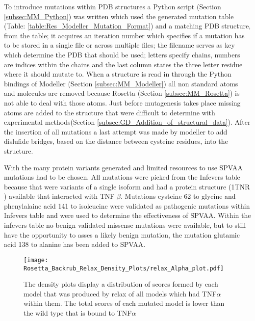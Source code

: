 	\newpage
	To introduce mutations within PDB structures a Python script (Section \ref{subsec:MM_Python}) was written which used the generated mutation table (Table: \ref{table:Res_Modeller_Mutation_Format}) and a matching PDB structure, from the table; it acquires an iteration number which specifies if a mutation has to be stored in a single file or across multiple files; the filename serves as key which determine the PDB that should be used; letters specify chains, numbers are indices within the chains and the last column states the three letter residue where it should mutate to. When a structure is read in through the Python bindings of Modeller (Section \ref{subsec:MM_Modeller}) all non standard atoms and molecules are removed because Rosetta (Section \ref{subsec:MM_Rosetta}) is not able to deal with those atoms. Just before mutagenesis takes place missing atoms are added to the structure that were difficult to determine with experimental methods(Section \ref{subsec:GD_Addition_of_structural_data}). After the insertion of all mutations a last attempt was made by modeller to add dislufide bridges, based on the distance between cysteine residues, into the structure.
	
	With the many protein variants generated and limited resources to use SPVAA mutations had to be chosen. All mutations were picked from the Infevers table because that were variants of a single isoform and had a protein structure (1TNR \cite{}) available that interacted with TNF $\beta$. 
	Mutations cysteine 62 to glycine and phenylalaine acid 141 to isoleucine were validated as pathogenic mutations within Infevers table and were used to determine the effectiveness of SPVAA. Within the infevers table no benign validated missense mutations were available, but to still have the opportunity to asses a likely benign mutation, the mutation glutamic acid 138 to alanine has been added to SPVAA.	
	
	\newpage
	\begin{figure}[!ht]
		\centering
		\texttt{[image: Rosetta\_Backrub\_Relax\_Density\_Plots/relax\_Alpha\_plot.pdf]}
		\caption[TNF-$\alpha$ relax score plots]{The density plots display a distribution of scores formed by each model that was produced by relax of all models which had TNF$\alpha$ within them. The total scores of each mutated model is lower than the wild type that is bound to TNF$\alpha$}
		\label{fig:relax_TNFA_scores}
	\end{figure}

